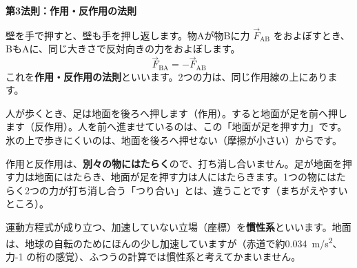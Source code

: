 \noindent\textbf{第3法則：作用・反作用の法則}\par
\noindent\label{ph:力-2:sayou}壁を手で押すと、壁も手を押し返します。物Aが物Bに力 $\vec F_{\mathrm{AB}}$ をおよぼすとき、BもAに、同じ大きさで反対向きの力をおよぼします。
\[ \vec F_{\mathrm{BA}}=-\vec F_{\mathrm{AB}} \]
これを\textbf{作用・反作用の法則}といいます。2つの力は、同じ作用線の上にあります。

\noindent\begin{minipage}[c]{0.5\linewidth}\centering
{}
\end{minipage}\hfill
\begin{minipage}[c]{0.47\linewidth}
人が歩くとき、足は地面を後ろへ押します（作用）。すると地面が足を前へ押します（反作用）。人を前へ進ませているのは、この「地面が足を押す力」です。氷の上で歩きにくいのは、地面を後ろへ押せない（摩擦が小さい）からです。
\end{minipage}

\par\vspace{3pt}
作用と反作用は、\textbf{別々の物にはたらく}ので、打ち消し合いません。足が地面を押す力は地面にはたらき、地面が足を押す力は人にはたらきます。1つの物にはたらく2つの力が打ち消し合う「つり合い」とは、違うことです（まちがえやすいところ）。

\begin{phflow}[運動の法則]
\end{phflow}

\begin{seikaku}
運動方程式が成り立つ、加速していない立場（座標）を\textbf{慣性系}といいます。地面は、地球の自転のためにほんの少し加速していますが（赤道で約\qty{0.034}{m/s^2}、力-1 の桁の感覚）、ふつうの計算では慣性系と考えてかまいません。
\end{seikaku}


